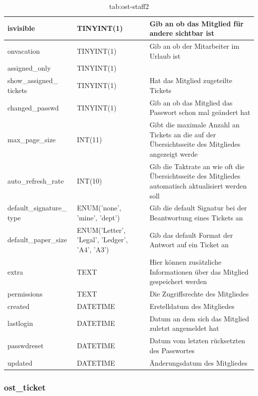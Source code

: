 		\label{tab:ost_staff}
		\newpage
		\begin{table}[h]
			\begin{tabular}{|p{3.5cm}|p{4cm}|p{6.2cm}|}
		\hline
		isvisible & TINYINT(1) & Gib an ob das Mitglied für andere sichtbar ist \\
		\hline
		onvacation & TINYINT(1) & Gib an ob der Mitarbeiter im Urlaub ist \\
		\hline
		assigned\_only & TINYINT(1) & \\
		\hline
		show\_assigned\_ tickets & TINYINT(1) & Hat das Mitglied zugeteilte Tickets \\
		\hline
		changed\_passwd & TINYINT(1) & Gib an ob das Mitglied das Passwort schon mal geändert hat\\
		\hline
		max\_page\_size & INT(11) & Gibt die maximale Anzahl an Tickets an die auf der Übersichtsseite des Mitgliedes angezeigt werde \\
		\hline
		auto\_refresh\_rate & INT(10) & Gib die Taktrate an wie oft die Übersichtsseite des Mitgliedes automatisch aktualisiert werden soll \\
		\hline
		default\_signature\_ type & ENUM('none', 'mine', 'dept') & Gib die default Signatur bei der Beantwortung eines Tickets an \\
		\hline
		default\_paper\_size & ENUM('Letter', 'Legal', 'Ledger', 'A4', 'A3') & Gib das default Format der Antwort auf ein Ticket an \\
		\hline
		extra & TEXT & Hier können zusätzliche Informationen über das Mitglied gespeichert werden \\
		\hline
		permissions & TEXT & Die Zugriffsrechte des Mitgliedes \\
		\hline
		created & DATETIME & Erstelldatum des Mitgliedes \\
		\hline
		lastlogin & DATETIME & Datum an dem sich das Mitglied zuletzt angemeldet hat \\
		\hline
		passwdreset & DATETIME & Datum vom letzten rücksetzten des Passwortes \\
		\hline
		updated & DATETIME & Änderungsdatum des Mitgliedes \\
		\hline
	\end{tabular}
	\caption{tab:ost-staff2}
\end{table}
\label{tab:ost_staff2}

\newpage

\subsubsection{ost\_ticket}

